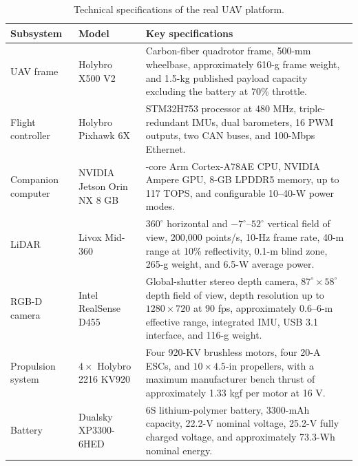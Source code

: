 
\begin{table}[!htbp]
    \centering
    \caption{Technical specifications of the real UAV platform.}
    \label{tab:real_uav_hardware}
    \small
    \setlength{\tabcolsep}{5pt}
    \renewcommand{\arraystretch}{1.15}

    \begin{tabularx}{\textwidth}{
        @{}
        >{\raggedright\arraybackslash}p{2.3cm}
        >{\raggedright\arraybackslash}p{3.2cm}
        >{\raggedright\arraybackslash}X
        @{}
    }
        \toprule
        \textbf{Subsystem} &
        \textbf{Model} &
        \textbf{Key specifications} \\
        \midrule

        UAV frame &
        Holybro X500 V2 &
        Carbon-fiber quadrotor frame, 500-mm wheelbase,
        approximately 610-g frame weight, and 1.5-kg published
        payload capacity excluding the battery at 70\% throttle. \\

        Flight controller &
        Holybro Pixhawk 6X &
        STM32H753 processor at 480 MHz, triple-redundant IMUs,
        dual barometers, 16 PWM outputs, two CAN buses,
        and 100-Mbps Ethernet. \\

        Companion computer &
        NVIDIA Jetson Orin NX 8 GB &
        6-core Arm Cortex-A78AE CPU, NVIDIA Ampere GPU,
        8-GB LPDDR5 memory, up to 117 TOPS,
        and configurable 10--40-W power modes. \\

        LiDAR &
        Livox Mid-360 &
        $360^{\circ}$ horizontal and $-7^{\circ}$--$52^{\circ}$
        vertical field of view, 200,000 points/s, 10-Hz frame rate,
        40-m range at 10\% reflectivity, 0.1-m blind zone,
        265-g weight, and 6.5-W average power. \\

        RGB-D camera &
        Intel RealSense D455 &
        Global-shutter stereo depth camera,
        $87^{\circ}\times58^{\circ}$ depth field of view,
        depth resolution up to $1280\times720$ at 90 fps,
        approximately 0.6--6-m effective range,
        integrated IMU, USB 3.1 interface, and 116-g weight. \\

        Propulsion system &
        $4\times$ Holybro 2216 KV920 &
        Four 920-KV brushless motors, four 20-A ESCs,
        and $10\times4.5$-in propellers, with a maximum
        manufacturer bench thrust of approximately
        1.33 kgf per motor at 16 V. \\

        Battery &
        Dualsky XP3300-6HED &
        6S lithium-polymer battery, 3300-mAh capacity,
        22.2-V nominal voltage, 25.2-V fully charged voltage,
        and approximately 73.3-Wh nominal energy. \\

        \bottomrule
    \end{tabularx}
\end{table}
